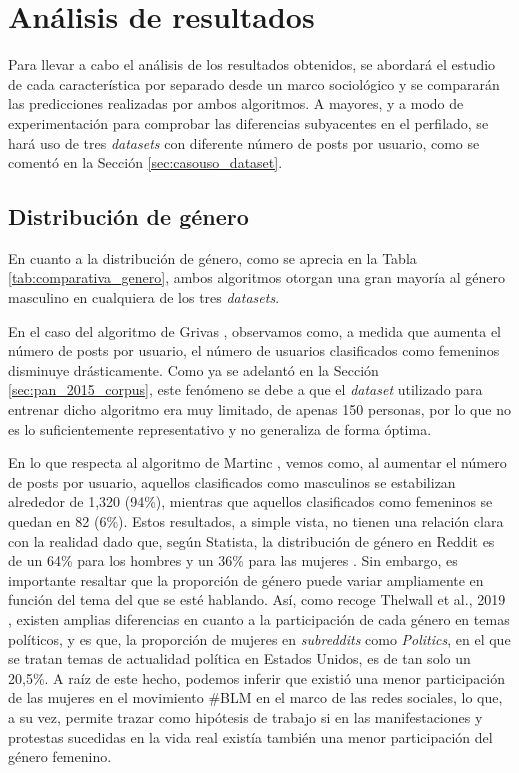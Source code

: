 \section{Análisis de resultados}
\label{sec:casouso_analisis}

Para llevar a cabo el análisis de los resultados obtenidos, se abordará el estudio de cada característica por separado desde un marco sociológico y se
compararán las predicciones realizadas por ambos algoritmos. A mayores, y a modo de experimentación para comprobar las diferencias subyacentes en el perfilado,
se hará uso de tres \textit{datasets} con diferente número de posts por usuario, como se comentó en la Sección \ref{sec:casouso_dataset}.

\subsection{Distribución de género}
\label{subsec:casouso_analisis_genero}

En cuanto a la distribución de género, como se aprecia en la Tabla \ref{tab:comparativa_genero}, ambos algoritmos otorgan una gran mayoría al género masculino en cualquiera de
los tres \textit{datasets}.

\bigskip
En el caso del algoritmo de Grivas \cite{grivas2015author}, observamos como, a medida que aumenta el número de posts por usuario,
el número de usuarios clasificados como femeninos disminuye drásticamente. Como ya se adelantó en la Sección \ref{sec:pan_2015_corpus}, este fenómeno se debe a que el \textit{dataset} utilizado para entrenar
dicho algoritmo era muy limitado, de apenas 150 personas, por lo que no es lo suficientemente representativo y no generaliza de forma óptima.

\bigskip
En lo que respecta al algoritmo de Martinc \cite{martinc2019hot}, vemos como, al aumentar el número de posts por usuario, aquellos clasificados como masculinos
se estabilizan alrededor de 1,320 (94\%), mientras que aquellos clasificados como femeninos se quedan en 82 (6\%).
Estos resultados, a simple vista, no tienen una relación clara con la realidad dado que, según Statista, la distribución de género en Reddit es
de un 64\% para los hombres y un 36\% para las mujeres \cite{statistagenero}.
Sin embargo, es importante resaltar que la proporción de género puede variar ampliamente
en función del tema del que se esté hablando. Así, como recoge Thelwall et al., 2019 \cite{thelwall2019she}, existen amplias diferencias en cuanto a la participación
de cada género en temas políticos, y es que, la proporción de mujeres en \textit{subreddits} como \textit{Politics}, en el que se tratan temas de actualidad
política en Estados Unidos, es de tan solo un 20,5\%. A raíz de este hecho, podemos inferir que existió una menor participación de las mujeres en el movimiento \#BLM
en el marco de las redes sociales, lo que, a su vez, permite trazar como hipótesis de trabajo si en las manifestaciones y protestas
sucedidas en la vida real existía también una menor participación del género femenino.


